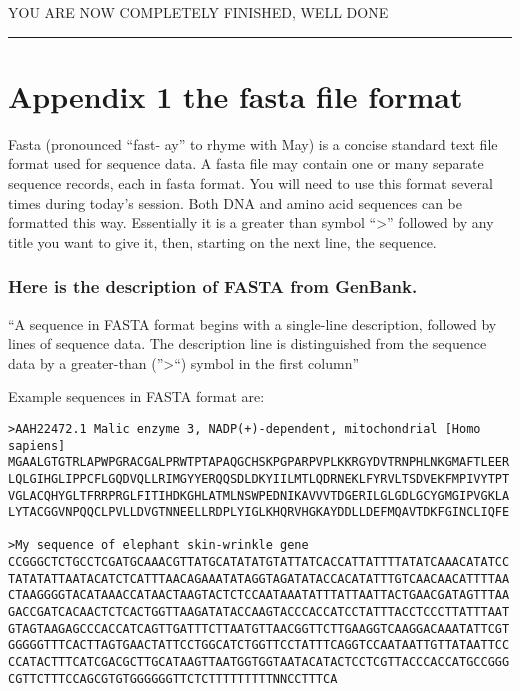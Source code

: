 \documentclass[11pt]{article}
\begin{document}
YOU ARE NOW COMPLETELY FINISHED, WELL DONE

    \begin{center}\rule{0.5\linewidth}{\linethickness}\end{center}

\hypertarget{appendix-1-the-fasta-file-format}{%
\section{Appendix 1 the fasta file
format}\label{appendix-1-the-fasta-file-format}}

Fasta (pronounced ``fast- ay'' to rhyme with May) is a concise standard
text file format used for sequence data. A fasta file may contain one or
many separate sequence records, each in fasta format. You will need to
use this format several times during today's session. Both DNA and amino
acid sequences can be formatted this way. Essentially it is a greater
than symbol ``\textgreater{}'' followed by any title you want to give
it, then, starting on the next line, the sequence.

\hypertarget{here-is-the-description-of-fasta-from-genbank.}{%
\subsubsection{Here is the description of FASTA from
GenBank.}\label{here-is-the-description-of-fasta-from-genbank.}}

``A sequence in FASTA format begins with a single-line description,
followed by lines of sequence data. The description line is
distinguished from the sequence data by a greater-than
(''\textgreater{}``) symbol in the first column''

Example sequences in FASTA format are:

\begin{verbatim}
>AAH22472.1 Malic enzyme 3, NADP(+)-dependent, mitochondrial [Homo sapiens]
MGAALGTGTRLAPWPGRACGALPRWTPTAPAQGCHSKPGPARPVPLKKRGYDVTRNPHLNKGMAFTLEER
LQLGIHGLIPPCFLGQDVQLLRIMGYYERQQSDLDKYIILMTLQDRNEKLFYRVLTSDVEKFMPIVYTPT
VGLACQHYGLTFRRPRGLFITIHDKGHLATMLNSWPEDNIKAVVVTDGERILGLGDLGCYGMGIPVGKLA
LYTACGGVNPQQCLPVLLDVGTNNEELLRDPLYIGLKHQRVHGKAYDDLLDEFMQAVTDKFGINCLIQFE

>My sequence of elephant skin-wrinkle gene
CCGGGCTCTGCCTCGATGCAAACGTTATGCATATATGTATTATCACCATTATTTTATATCAAACATATCC
TATATATTAATACATCTCATTTAACAGAAATATAGGTAGATATACCACATATTTGTCAACAACATTTTAA
CTAAGGGGTACATAAACCATAACTAAGTACTCTCCAATAAATATTTATTAATTACTGAACGATAGTTTAA
GACCGATCACAACTCTCACTGGTTAAGATATACCAAGTACCCACCATCCTATTTACCTCCCTTATTTAAT
GTAGTAAGAGCCCACCATCAGTTGATTTCTTAATGTTAACGGTTCTTGAAGGTCAAGGACAAATATTCGT
GGGGGTTTCACTTAGTGAACTATTCCTGGCATCTGGTTCCTATTTCAGGTCCAATAATTGTTATAATTCC
CCATACTTTCATCGACGCTTGCATAAGTTAATGGTGGTAATACATACTCCTCGTTACCCACCATGCCGGG
CGTTCTTTCCAGCGTGTGGGGGGTTCTCTTTTTTTTTNNCCTTTCA
\end{verbatim}
\end{document}
